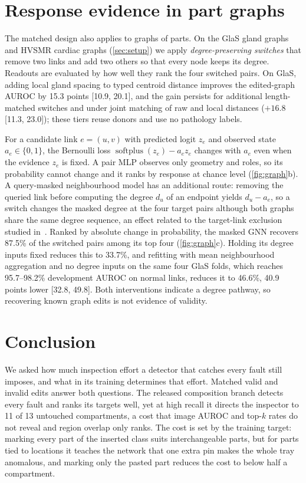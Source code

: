 \documentclass[10pt,twocolumn,letterpaper]{article}
\begin{document}
\section{Response evidence in part graphs}
\label{sec:graph}
The matched design also applies to graphs of parts. On the GlaS gland graphs and HVSMR cardiac graphs (\cref{sec:setup}) we apply \emph{degree-preserving switches} that remove two links and add two others so that every node keeps its degree. Readouts are evaluated by how well they rank the four switched pairs. On GlaS, adding local gland spacing to typed centroid distance improves the edited-graph AUROC by 15.3 points [10.9, 20.1], and the gain persists for additional length-matched switches and under joint matching of raw and local distances ($+16.8$ [11.3, 23.0]); these tiers reuse donors and use no pathology labels.

For a candidate link $e=(u,v)$ with predicted logit $z_e$ and observed state $a_e\in\{0,1\}$, the Bernoulli loss $\operatorname{softplus}(z_e)-a_ez_e$ changes with $a_e$ even when the evidence $z_e$ is fixed. A pair MLP observes only geometry and roles, so its probability cannot change and it ranks by response at chance level (\cref{fig:graph}b). A query-masked neighbourhood model has an additional route: removing the queried link before computing the degree $d_u$ of an endpoint yields $d_u-a_e$, so a switch changes the masked degree at the four target pairs although both graphs share the same degree sequence, an effect related to the target-link exclusion studied in~\cite{zhu2024spot}. Ranked by absolute change in probability, the masked GNN recovers 87.5\% of the switched pairs among its top four (\cref{fig:graph}c). Holding its degree inputs fixed reduces this to 33.7\%, and refitting with mean neighbourhood aggregation and no degree inputs on the same four GlaS folds, which reaches 95.7--98.2\% development AUROC on normal links, reduces it to 46.6\%, 40.9 points lower [32.8, 49.8]. Both interventions indicate a degree pathway, so recovering known graph edits is not evidence of validity.

\section{Conclusion}
\label{sec:conclusion}
\label{sec:discussion}
We asked how much inspection effort a detector that catches every fault still imposes, and what in its training determines that effort. Matched valid and invalid edits answer both questions. The released composition branch detects every fault and ranks its targets well, yet at high recall it directs the inspector to 11 of 13 untouched compartments, a cost that image AUROC and top-$k$ rates do not reveal and region overlap only ranks. The cost is set by the training target: marking every part of the inserted class suits interchangeable parts, but for parts tied to locations it teaches the network that one extra pin makes the whole tray anomalous, and marking only the pasted part reduces the cost to below half a compartment.
\end{document}
